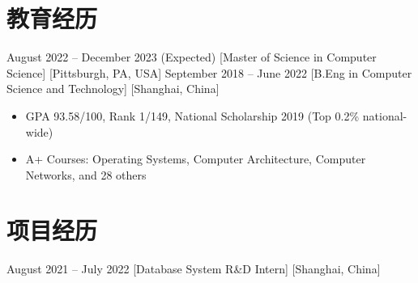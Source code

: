\documentclass{chicv}
\begin{document}

\begin{namephoto}
\ifshowphoto
  \vspace*{0.3cm}  %
\fi
{}
\begin{basicinfo}
\end{basicinfo}
\end{namephoto}

\ifshowphoto
  \vspace{0.3cm}  %
\fi


\section{教育经历}
  {August 2022 -- December 2023 (Expected)}
  [Master of Science in Computer Science]
  [Pittsburgh, PA, USA]
  {September 2018 -- June 2022}
  [B.Eng in Computer Science and Technology]
  [Shanghai, China]
  \begin{itemize}
    \item GPA 93.58/100, Rank 1/149, National Scholarship 2019 (Top 0.2\% national-wide)
    \item A+ Courses: Operating Systems, Computer Architecture, Computer Networks, and 28 others
  \end{itemize}

\section{项目经历}

  {August 2021 – July 2022}
  [Database System R\&D Intern]
  [Shanghai, China]
\end{document}
